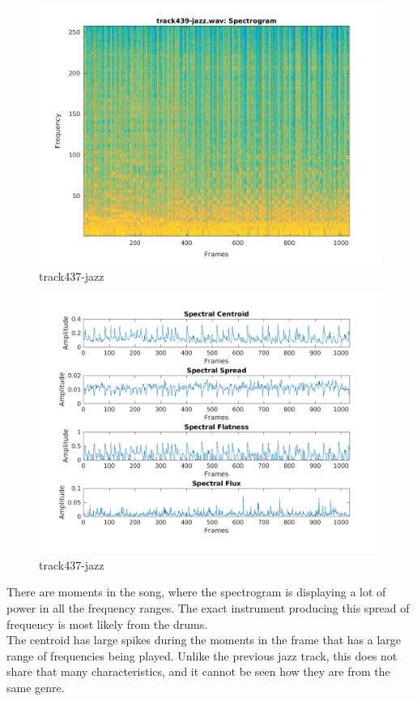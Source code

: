 \documentclass[11pt, a4paper]{article}
\begin{document}
\begin{figure}[H]
    \centering
    \includegraphics[width=.75\textwidth]{track439-jazz-specto.png}
    \caption{track437-jazz}
\end{figure}
\begin{figure}[H]
    \centering
    \includegraphics[width=1\textwidth]{track439-jazz-spectral.png}
    \caption{track437-jazz}
\end{figure}

\pagebreak

There are moments in the song, where the spectrogram is displaying a lot of power in all the frequency ranges. The exact instrument producing this spread of frequency is most likely from the drums. \\

The centroid has large spikes during the moments in the frame that has a large range of frequencies being played. Unlike the previous jazz track, this does not share that many characteristics, and it cannot be seen how they are from the same genre. \\
\end{document}
